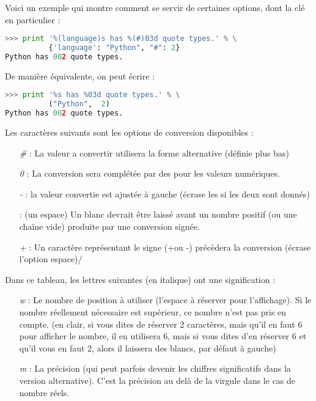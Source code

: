 \documentclass[a4paper,twoside]{article}
\begin{document}
Voici un exemple qui montre comment se servir de certaines options, dont la clé en particulier : 
\begin{lstlisting}[language=python]
>>> print '%(language)s has %(#)03d quote types.' % \
          {'language': "Python", "#": 2}
Python has 002 quote types.
\end{lstlisting}

De manière équivalente, on peut écrire :
\begin{lstlisting}[language=python]
>>> print '%s has %03d quote types.' % \
          ("Python",  2)
Python has 002 quote types.
\end{lstlisting}

Les caractères suivants sont les options de conversion disponibles :
\begin{itemize}
\item[\emph{\#}]: La valeur a convertir utilisera la forme alternative (définie plus bas)
\item[\emph{0}]: La conversion sera complétée par des \fg pour les valeurs numériques.
\item[\emph{-}]: la valeur convertie est ajustée à gauche (écrase les \fg si les deux sont donnés)
\item[\emph{ }]: (un espace) Un blanc devrait être laissé avant un nombre positif (ou une chaîne vide) produite par une conversion signée.
\item[\emph{+}]: Un caractère représentant le signe (\og+\fg ou \og-\fg) précèdera la conversion (écrase l'option \og espace\fg)/
\end{itemize}

Dans ce tableau, les lettres suivantes (en italique) ont une signification :
\begin{itemize}
\item[\emph{w}]: Le nombre de position à utiliser (l'espace à réserver pour l'affichage). Si le nombre réellement nécessaire est supérieur, ce nombre n'est pas pris en compte. (en clair, si vous dites de réserver 2 caractères, mais qu'il en faut 6 pour afficher le nombre, il en utilisera 6, mais si vous dites d'en réserver 6 et qu'il vous en faut 2, alors il laissera des blancs, par défaut à gauche)
\item[\emph{m}]: La précision (qui peut parfois devenir les chiffres significatifs dans la version alternative). C'est la précision au delà de la virgule dans le cas de nombre réels.
\end{itemize}
\end{document}
